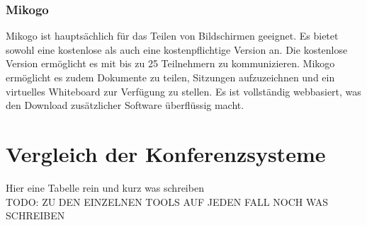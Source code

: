 \subsubsection{Mikogo}
Mikogo ist hauptsächlich für das Teilen von Bildschirmen geeignet.
Es bietet sowohl eine kostenlose als auch eine kostenpflichtige Version an.
Die kostenlose Version ermöglicht es mit bis zu 25 Teilnehmern zu kommunizieren.
Mikogo ermöglicht es zudem Dokumente zu teilen, Sitzungen aufzuzeichnen und ein virtuelles Whiteboard zur Verfügung zu stellen.
Es ist vollständig webbasiert, was den Download zusätzlicher Software überflüssig macht.
\autocite[Vgl.][]{M_Straub.o.J.}

\section{Vergleich der Konferenzsysteme}
Hier eine Tabelle rein und kurz was schreiben\\
TODO: ZU DEN EINZELNEN TOOLS AUF JEDEN FALL NOCH WAS SCHREIBEN